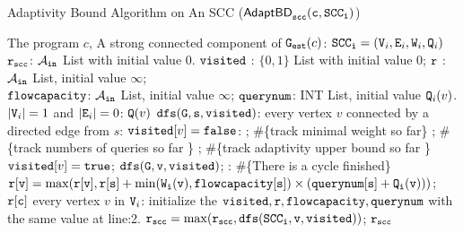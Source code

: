 {\footnotesize
\begin{algorithm}
            \caption{
            {\small Adaptivity Bound Algorithm on An SCC ({$\mathtt{\mathsf{AdaptBD}_{scc}(c, SCC_i)}$})}
            \label{alg:adaptscc}
            }
            \begin{algorithmic}[1]
              \REQUIRE The program $c$, 
              A strong connected component of $\mathtt{{G_{est}}}(c)$: $ \mathtt{SCC_i} = (\mathtt{V}_i, \mathtt{E}_i, \mathtt{W}_i, \mathtt{Q}_i)$
            $\mathtt{r_{scc}}$: $\mathcal{A}_{\mathtt{in}}$ List with initial value $0$.
            $\mathtt{visited}$ : $\{0, 1\}$ List with initial value $0$;
            $\mathtt{r}$ : $\mathcal{A}_{\mathtt{in}}$ List, initial value $\infty$;
            \\ \qquad  
            $\mathtt{flowcapacity}$: $\mathcal{A}_{\mathtt{in}}$ List, initial value $\infty$;
            $\mathtt{querynum}$: INT List, initial value $\mathtt{Q}_i(v)$.
             $|\mathtt{V}_i| = 1$ and $|\mathtt{E}_i| = 0$:
              $\mathtt{Q}(v)$
             {$\mathtt{dfs(G,s,visited)}$}:
            \STATE {} every vertex $v$ 
            connected by a directed edge from $s$:
            \STATE \qquad {} $\mathtt{visited}[v] = \mathtt{false}$:
            \STATE \qquad \qquad {}; \qquad \qquad \#\{{track minimal weight so far}\}
            \STATE \qquad \qquad {}; \qquad \qquad \qquad \qquad\#\{{track numbers of queries so far} \}
            \STATE \qquad \qquad {}; \#\{{track adaptivity upper bound so far} \}
            \STATE \qquad \qquad \qquad  $\mathtt{visited}[v] = \mathtt{true}$; %
            \quad $\mathtt{dfs(G, v, visited)}$;
            \STATE \qquad {}: \#\{There is a cycle finished\}
            \STATE \qquad \qquad \qquad 
            {\small{$\mathtt{r[v] =  \max(r[v], r[s] +\min(\mathtt{W}_i(v), {flowcapacity}[s]) \times (querynum[s] + \mathtt{Q}_i(v)))}$}};
            \STATE {}  $\mathtt{r[c]}$
             every vertex $v$ in $\mathtt{V}_i$:
            \STATE  \qquad initialize the $\mathtt{visited, r, flowcapacity, querynum}$ with the same value at line:2.
            \STATE  \qquad $\mathtt{r_{scc} = \max(r_{scc}, dfs(SCC_i, v, \mathtt{visited} ))}$;
            \RETURN  $\mathtt{r_{scc}}$
            \end{algorithmic}
            \end{algorithm}
}           

